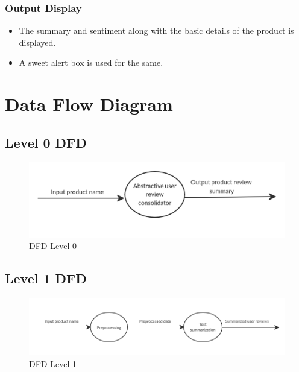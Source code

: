 \documentclass[11pt]{report}
\begin{document}
\subsection{Output Display}
\begin{itemize}
\item The summary and sentiment along with the basic details of the product is displayed.
\item A sweet alert box is used for the same.
\end{itemize}

\chapter{Data Flow Diagram}
\section{Level 0 DFD}
\begin{figure}[hbt!]
\centering
\includegraphics[scale=0.4]{DFDlevel0.png}
\caption{DFD Level 0}
\label{fig:dfd0}
\end{figure}

\section{Level 1 DFD}
\begin{figure}[hbt!]
\centering
\includegraphics[scale=0.6]{DFDlevel1.png}
\caption{DFD Level 1}
\label{fig:dfd1}
\end{figure}

\newpage
\end{document}
